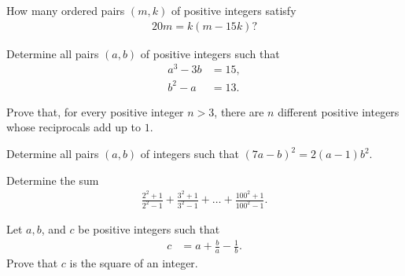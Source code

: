 \documentclass[problems.tex]{subfile}
\begin{document}
	
	
	\begin{problem}
		How many ordered pairs $(m, k)$ of positive integers satisfy
		\begin{align*}
			20m = k(m - 15k)?
		\end{align*}
	\end{problem}
	
	
	
	\begin{problem}
		Determine all pairs $(a, b)$ of positive integers such that
		\begin{align*}
			a^3 - 3b &= 15,\\
			b^2 - a  &= 13.
		\end{align*}
	\end{problem}
	
	
	
	
	\begin{problem}
		Prove that, for every positive integer $n > 3$, there are $n$ different positive integers whose reciprocals add up to $1$.
	\end{problem}
	
	
	
	\begin{problem}
		Determine all pairs $(a, b)$ of integers such that $(7a - b)^2 = 2(a - 1)b^2$.
	\end{problem}
	
	
	
	
	\begin{problem}
		Determine the sum
		\begin{align*}
			\frac{2^2+1}{2^2-1} + \frac{3^2+1}{3^2-1} + \dots + \frac{100^2+1}{100^2-1}.
		\end{align*}
	\end{problem}
	
	
	
	\begin{problem}
		Let $a,b$, and $c$ be positive integers such that
		\begin{align*}
			c &= a + \frac{b}{a} - \frac{1}{b}.
		\end{align*}
		Prove that $c$ is the square of an integer.
	\end{problem}
	
	
	
\end{document}

